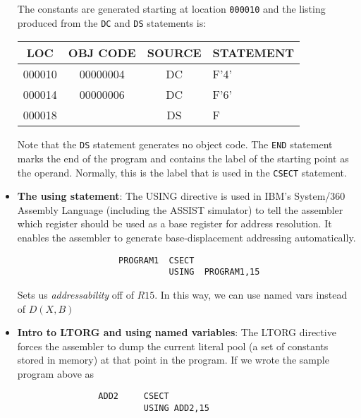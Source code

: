 \documentclass{report}
\begin{document}
\begin{itemize}
                   The constants are generated starting at location \texttt{000010} and the listing produced from the \texttt{DC} and \texttt{DS} statements is:
                   \begin{center}
                       \begin{tabular}{|c|c|c|l|}
                           \hline
                           \textbf{LOC}   & \textbf{OBJ CODE} & \textbf{SOURCE} & \textbf{STATEMENT} \\ \hline
                           000010         & 00000004          & DC              & F'4'               \\ \hline
                           000014         & 00000006          & DC              & F'6'               \\ \hline
                           000018         &                   & DS              & F                  \\ \hline
                       \end{tabular}
                   \end{center}
                   Note that the \texttt{DS} statement generates no object code.
                   \bigbreak \noindent 
                   The \texttt{END} statement marks the end of the program and contains the label of the starting point as the operand. Normally, this is the label that is used in the \texttt{CSECT} statement.
                \item \textbf{The using statement}: The USING directive is used in IBM's System/360 Assembly Language (including the ASSIST simulator) to tell the assembler which register should be used as a base register for address resolution. It enables the assembler to generate base-displacement addressing automatically.
                    \bigbreak \noindent 
                    \begin{verbatim}
                    PROGRAM1  CSECT 
                              USING  PROGRAM1,15
                    \end{verbatim}
                    \bigbreak \noindent 
                    Sets us \textit{addressability} off of $R15$. In this way, we can use named vars instead of $D(X,B)$
                \item \textbf{Intro to LTORG and using named variables}: The LTORG directive forces the assembler to dump the current literal pool (a set of constants stored in memory) at that point in the program.
                    \bigbreak \noindent 
                    If we wrote the sample program above as
                    \bigbreak \noindent 
                    \begin{verbatim}
                ADD2     CSECT 
                         USING ADD2,15


\end{verbatim}
\end{itemize}
\end{document}
